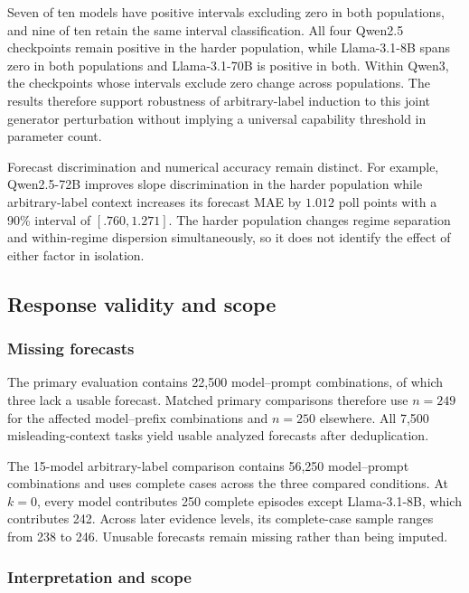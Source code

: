 Seven of ten models have positive intervals excluding zero in both populations, and nine of ten retain the same interval classification.
All four Qwen2.5 checkpoints remain positive in the harder population, while Llama-3.1-8B spans zero in both populations and Llama-3.1-70B is positive in both.
Within Qwen3, the checkpoints whose intervals exclude zero change across populations.
The results therefore support robustness of arbitrary-label induction to this joint generator perturbation without implying a universal capability threshold in parameter count.

Forecast discrimination and numerical accuracy remain distinct.
For example, Qwen2.5-72B improves slope discrimination in the harder population while arbitrary-label context increases its forecast MAE by \(1.012\) poll points with a 90\% interval of \([.760,1.271]\).
The harder population changes regime separation and within-regime dispersion simultaneously, so it does not identify the effect of either factor in isolation.

\subsection{Response validity and scope}
\label{app:coin-city-limitations}

\subsubsection{Missing forecasts}

The primary evaluation contains 22,500 model--prompt combinations, of which three lack a usable forecast.
Matched primary comparisons therefore use \(n=249\) for the affected model--prefix combinations and \(n=250\) elsewhere.
All 7,500 misleading-context tasks yield usable analyzed forecasts after deduplication.

The 15-model arbitrary-label comparison contains 56,250 model--prompt combinations and uses complete cases across the three compared conditions.
At \(k=0\), every model contributes 250 complete episodes except Llama-3.1-8B, which contributes 242.
Across later evidence levels, its complete-case sample ranges from 238 to 246.
Unusable forecasts remain missing rather than being imputed.

\subsubsection{Interpretation and scope}

